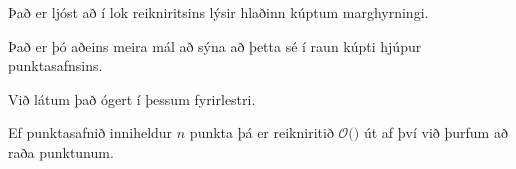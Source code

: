 {
}

{
	{
		\item<1-> Það er ljóst að í lok reikniritsins lýsir hlaðinn kúptum marghyrningi.
		\item<2-> Það er þó aðeins meira mál að sýna að þetta sé í raun kúpti hjúpur punktasafnsins.
		\item<3-> Við látum það ógert í þessum fyrirlestri.
		\item<4-> Ef punktasafnið inniheldur $n$ punkta þá er reikniritið $\mathcal{O}($$)$ út af því við þurfum að 
			raða punktunum.
	}
}

{
}


